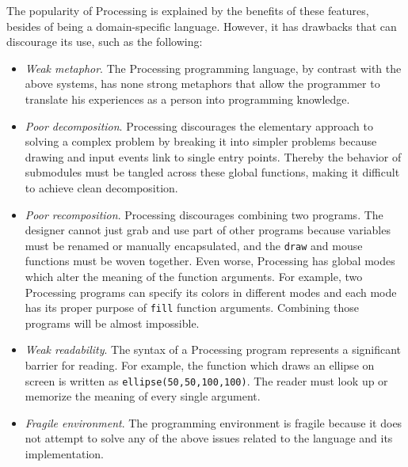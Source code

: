 The popularity of Processing is explained by the benefits of these features, besides of being a domain-specific language. However, it has drawbacks that can discourage its use, such as the following:

\begin{itemize}
  \item \textit{Weak metaphor}. The Processing programming language, by contrast with the above systems, has none strong metaphors that allow the programmer to translate his experiences as a person into programming knowledge. 

  \item \textit{Poor decomposition}. Processing discourages the elementary approach to solving a complex problem by breaking it into simpler problems because drawing and input events link to single entry points. Thereby the behavior of submodules must be tangled across these global functions, making it difficult to achieve clean decomposition.

  \item \textit{Poor recomposition}. Processing discourages combining two programs. The designer cannot just grab and use part of other programs because variables must be renamed or manually encapsulated, and the \texttt{draw} and mouse functions must be woven together. Even worse, Processing has global modes which alter the meaning of the function arguments. For example, two Processing programs can specify its colors in different modes and each mode has its proper purpose of \texttt{fill} function arguments. Combining those programs will be almost impossible. 

  \item \textit{Weak readability}. The syntax of a Processing program represents a significant barrier for reading. For example, the function which draws an ellipse on screen is written as \texttt{ellipse(50,50,100,100)}. The reader must look up or memorize the meaning of every single argument.

  \item \textit{Fragile environment}. The programming environment is fragile because it does not attempt to solve any of the above issues related to the language and its implementation.
\end{itemize}


